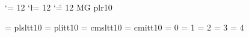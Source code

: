 %
%


%
%
\def\@Identical#1#2{%
  MG\fi
  \edef\@FirstString{#1}%
  \edef\@SecondString{#2}%
  \ifx \@FirstString \@SecondString
}
%
%
{%
 \catcode`\p = 12
 \catcode`\l = 12
 \catcode`\r = 12
 \xdef\xxx{plr10}
}
\if\@Identical{\xxx}{\fontname\tenrm}
  \font\tenttsl = plsltt10
  \font\tenttit = plitt10
\else
  \font\tenttsl = cmsltt10
  \font\tenttit = cmitt10
\fi
\let\IdentifierFont = \it
\let\TextFont = \sl
\let\KeywordFont = \bf
\let\CommentFont = \tenttit
\let\DirectiveFont = \tenttsl
\let\SymbolFont = \tt
\let\SpecialFont = \tt    %
%
%
\newif\if@TempBool            %
\newread\@InFile              %
\newcount\@CharCode           %
\newcount\@PrevChar           %
\newcount\@WhereAmI           %
\chardef\@NothingSpecial = 0
\chardef\@Text = 1
\chardef\@Directive = 2       %
\chardef\@ShortComment = 3    %
\chardef\@LongComment = 4     %
%
%
\def\neof#1{%
  MG\fi
  \ifeof#1
    \@TempBoolfalse
  \else
    \@TempBooltrue
  \fi
  \if@TempBool
}
%
%
\def\@TurnSpecialCharsOff{%
  \catcode`\/=12
  \catcode`\~=12
  \catcode`\#=12
  \catcode`\$=12
  \catcode`\%=12
  \catcode`\^=12
  \catcode`\&=12
  \catcode`\_=12
  \catcode`\\=12
  \catcode`\{=12
  \catcode`\}=12
  \catcode`\ =12
  \catcode`\^^M=12
}
%
%
\def\@PrepareCPas{%
  \begingroup
  \parindent=0pt
  \rightskip=0pt plus 1fil
  \@TurnSpecialCharsOff
  \def\@Word{}%
  \@WhereAmI = \@NothingSpecial
  \@PrevChar = 32
  \SymbolFont
}
